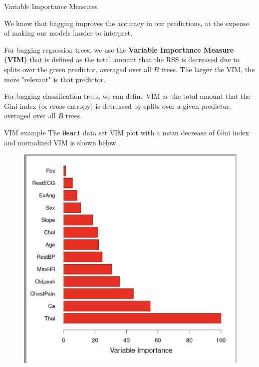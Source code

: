\documentclass{beamer}
\begin{document}
\begin{frame}{Variable Importance Measures}
	
	We know that bagging improves the accuracy in our predictions, at the expense of making our models harder to interpret. 
	
	For bagging regression trees, we use the {\bf Variable Importance Measure (VIM)} that is defined as the total amount that the RSS is decreased due to splits over the given predictor, averaged over all $B$ trees.  The larger the VIM, the more "relevant" is that predictor.
	
	For bagging classification trees, we can define VIM as the total amount that the Gini index (or cross-entropy) is decreased by splits over a given predictor, averaged over all $B$ trees. 
\end{frame}

\begin{frame}{VIM example}
	The {\tt Heart} data set VIM plot with a mean decrease of Gini index and normalized VIM is shown below.
	\begin{figure}[h]
		\centering
		\includegraphics[scale=0.35]{../../Figures/fig_vim.png}
	\end{figure}
	
\end{frame}
\end{document}
